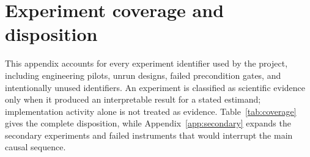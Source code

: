 \section{Experiment coverage and disposition}
\label{app:coverage}

This appendix accounts for every experiment identifier used by the project, including engineering pilots, unrun designs, failed precondition gates, and intentionally unused identifiers.
An experiment is classified as scientific evidence only when it produced an interpretable result for a stated estimand; implementation activity alone is not treated as evidence.
Table~\ref{tab:coverage} gives the complete disposition, while Appendix~\ref{app:secondary} expands the secondary experiments and failed instruments that would interrupt the main causal sequence.

